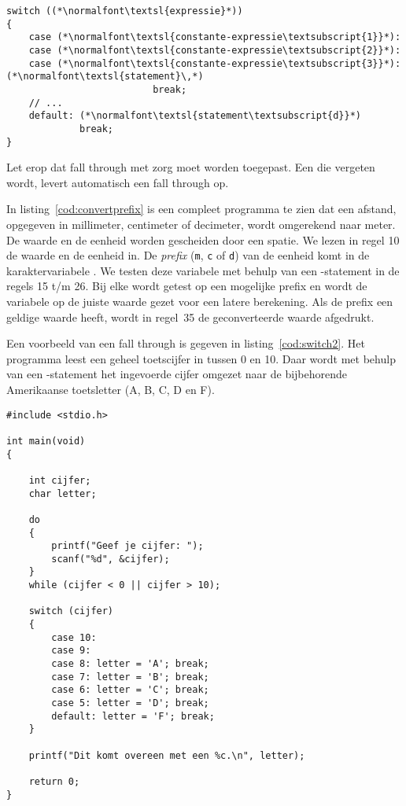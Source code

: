 \begin{lstlisting}[caption=Opzet van het \texttt{switch}-statment met fall through.,label=cod:switchfallthrough1]
switch ((*\normalfont\textsl{expressie}*))
{
    case (*\normalfont\textsl{constante-expressie\textsubscript{1}}*):
    case (*\normalfont\textsl{constante-expressie\textsubscript{2}}*):
    case (*\normalfont\textsl{constante-expressie\textsubscript{3}}*): (*\normalfont\textsl{statement}\,*)
                          break;
    // ...
    default: (*\normalfont\textsl{statement\textsubscript{d}}*)
             break;
}
\end{lstlisting}

Let erop dat fall through met zorg moet worden toegepast. Een  die vergeten wordt, levert automatisch een fall through op.

In listing~\ref{cod:convertprefix} is een compleet programma te zien dat een afstand, opgegeven in millimeter, centimeter of decimeter, wordt omgerekend naar meter. De waarde en de eenheid worden gescheiden door een spatie. We lezen in regel 10 de waarde en de eenheid in. De \textsl{prefix} (\texttt{m}, \texttt{c} of \texttt{d}) van de eenheid komt in de karaktervariabele . We testen deze variabele met behulp van een -statement in de regels 15 t/m 26.
%
%
Bij elke  wordt getest op een mogelijke prefix en wordt de variabele  op de juiste waarde gezet voor een latere berekening. Als de prefix een geldige waarde heeft, wordt in regel~35 de geconverteerde waarde afgedrukt.

Een voorbeeld van een fall through is gegeven in listing~\ref{cod:switch2}. Het programma leest een geheel toetscijfer in tussen 0 en 10. Daar wordt met behulp van een -statement het ingevoerde cijfer omgezet naar de bijbehorende Amerikaanse toetsletter (A, B, C, D en F).

\begin{lstlisting}[caption=Voorbeeld van het gebruik van het \texttt{switch}-statment met fall through.,label=cod:switch2]
#include <stdio.h>

int main(void)
{

    int cijfer;
    char letter;

    do
    {
        printf("Geef je cijfer: ");
        scanf("%d", &cijfer);
    }
    while (cijfer < 0 || cijfer > 10);

    switch (cijfer)
    {
        case 10:
        case 9:
        case 8: letter = 'A'; break;
        case 7: letter = 'B'; break;
        case 6: letter = 'C'; break;
        case 5: letter = 'D'; break;
        default: letter = 'F'; break;
    }

    printf("Dit komt overeen met een %c.\n", letter);

    return 0;
}
\end{lstlisting}

